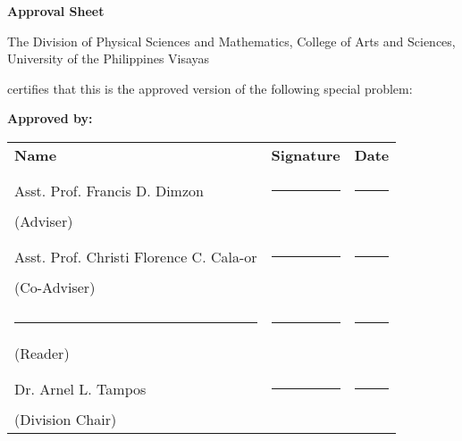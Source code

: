 \begin{center}
\textbf{Approval Sheet}
	
The Division of Physical Sciences and Mathematics, College of Arts and Sciences, University of the Philippines Visayas 

certifies that this is the approved version of the following special problem:

\end{center}

{\small\textbf{Approved by:}}

\newcommand{\signaturerule}{\rule{10em}{.4pt}}
\begin{tabular}{lll}
	\bfseries Name  & \bfseries Signature & \bfseries Date\\ \\
	Asst. Prof. Francis D. Dimzon &\signaturerule  & \signaturerule\\ 
	(Adviser)\\ \\
	Asst. Prof. Christi Florence C. Cala-or &\signaturerule &\signaturerule\\
	(Co-Adviser)\\ \\
	\signaturerule &\signaturerule &\signaturerule\\
	(Reader)\\ \\
	Dr. Arnel L. Tampos &\signaturerule &\signaturerule\\
	(Division Chair)
		
\end{tabular}
